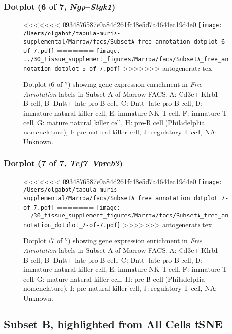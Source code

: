 \subsubsection{Dotplot (6 of 7, \emph{Ngp}--\emph{Styk1})}
\begin{figure}[h]
\centering
<<<<<<< 0934876587e0a84d261fc48e5d7a4644ec19d4e0
\texttt{[image: /Users/olgabot/tabula-muris-supplemental/Marrow/facs/SubsetA\_free\_annotation\_dotplot\_6-of-7.pdf]}
=======
\texttt{[image: ../30\_tissue\_supplement\_figures/Marrow/facs/SubsetA\_free\_annotation\_dotplot\_6-of-7.pdf]}
>>>>>>> autogenerate tex

\caption{ Dotplot (6 of 7)  showing gene expression enrichment in \emph{Free Annotation} labels in Subset A of Marrow FACS. A: Cd3e+ Klrb1+ B cell, B: Dntt+ late pro-B cell, C: Dntt- late pro-B cell, D: immature natural killer cell, E: immature NK T cell, F: immature T cell, G: mature natural killer cell, H: pre-B cell (Philadelphia nomenclature), I: pre-natural killer cell, J: regulatory T cell, NA: Unknown.}
\end{figure}


\clearpage

\subsubsection{Dotplot (7 of 7, \emph{Tcf7}--\emph{Vpreb3})}
\begin{figure}[h]
\centering
<<<<<<< 0934876587e0a84d261fc48e5d7a4644ec19d4e0
\texttt{[image: /Users/olgabot/tabula-muris-supplemental/Marrow/facs/SubsetA\_free\_annotation\_dotplot\_7-of-7.pdf]}
=======
\texttt{[image: ../30\_tissue\_supplement\_figures/Marrow/facs/SubsetA\_free\_annotation\_dotplot\_7-of-7.pdf]}
>>>>>>> autogenerate tex

\caption{ Dotplot (7 of 7)  showing gene expression enrichment in \emph{Free Annotation} labels in Subset A of Marrow FACS. A: Cd3e+ Klrb1+ B cell, B: Dntt+ late pro-B cell, C: Dntt- late pro-B cell, D: immature natural killer cell, E: immature NK T cell, F: immature T cell, G: mature natural killer cell, H: pre-B cell (Philadelphia nomenclature), I: pre-natural killer cell, J: regulatory T cell, NA: Unknown.}
\end{figure}


\clearpage
\subsection{Subset B, highlighted from All Cells tSNE}
